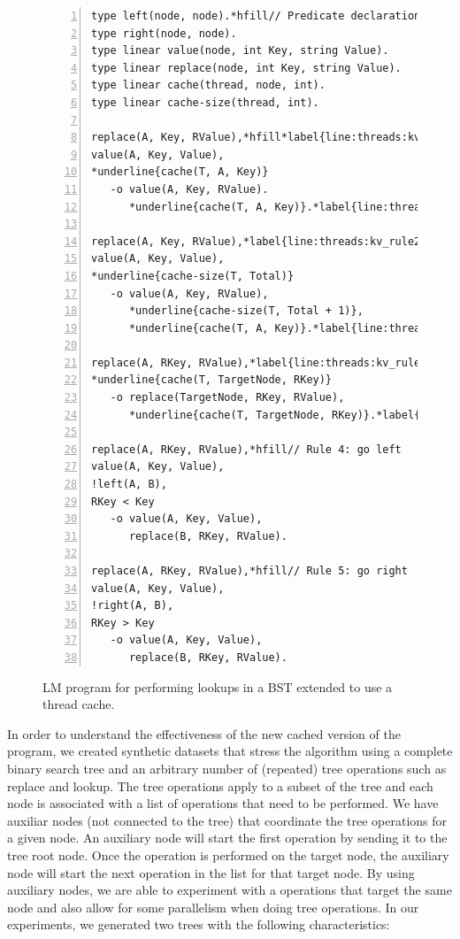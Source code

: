 \begin{figure}[ht]
\begin{Verbatim}[numbers=left,fontsize=\codesize,commandchars=*\{\}]
type left(node, node).*hfill// Predicate declaration
type right(node, node).
type linear value(node, int Key, string Value).
type linear replace(node, int Key, string Value).
type linear cache(thread, node, int).
type linear cache-size(thread, int).

replace(A, Key, RValue),*hfill*label{line:threads:kv_rule1_start}// Rule 1: key exists and is also in the cache
value(A, Key, Value),
*underline{cache(T, A, Key)}
   -o value(A, Key, RValue).
      *underline{cache(T, A, Key)}.*label{line:threads:kv_rule1_end}

replace(A, Key, RValue),*label{line:threads:kv_rule2_start}*hfill// Rule 2: key exists and is not in the cache
value(A, Key, Value),
*underline{cache-size(T, Total)}
   -o value(A, Key, RValue),
      *underline{cache-size(T, Total + 1)},
      *underline{cache(T, A, Key)}.*label{line:threads:kv_rule2_end}

replace(A, RKey, RValue),*label{line:threads:kv_rule3_start}*hfill// Rule 3: cached by the thread
*underline{cache(T, TargetNode, RKey)}
   -o replace(TargetNode, RKey, RValue),
      *underline{cache(T, TargetNode, RKey)}.*label{line:threads:kv_rule3_end}

replace(A, RKey, RValue),*hfill// Rule 4: go left
value(A, Key, Value),
!left(A, B),
RKey < Key
   -o value(A, Key, Value),
      replace(B, RKey, RValue).

replace(A, RKey, RValue),*hfill// Rule 5: go right
value(A, Key, Value),
!right(A, B),
RKey > Key
   -o value(A, Key, Value),
      replace(B, RKey, RValue).
\end{Verbatim}
\caption{LM program for performing lookups in a BST extended to use a thread cache.}
\label{code:threads:btree_lookup_cache}
\end{figure}

In order to understand the effectiveness of the new cached version of the
program, we created synthetic datasets that stress the algorithm using a
complete binary search tree and an arbitrary number of (repeated) tree
operations such as replace and lookup. The tree operations apply to a subset of
the tree and each node is associated with a list of operations that need to be
performed. We have auxiliar nodes (not connected to the tree) that coordinate
the tree operations for a given node. An auxiliary node will start the first
operation by sending it to the tree root node. Once the operation is performed
on the target node, the auxiliary node will start the next operation in the list
for that target node. By using auxiliary nodes, we are able to experiment with a
operations that target the same node and also allow for some parallelism when
doing tree operations. In our experiments, we generated two trees with the
following characteristics:

